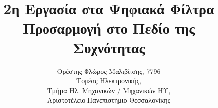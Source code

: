 

\renewcommand{\imageref}[1] {%
\hyperref[fig:#1]{Σχήμα \ref{fig:#1}}}
\renewcommand{\imagerefc}[2] {%
\hyperref[fig:#1]{#2}}

\newcommand{\imagehere}[2]{%
\begin{figure}[H]%
\centering%
\texttt{[image: images/\#1]}%
\caption{#2}
\label{fig:#1}%
\end{figure}%
}

\title{2η Εργασία στα Ψηφιακά Φίλτρα\\
Προσαρμογή στο Πεδίο της Συχνότητας}
\author{Ορέστης Φλώρος-Μαλιβίτσης, 7796\\
Τομέας Ηλεκτρονικής,\\
Τμήμα Ηλ. Μηχανικών / Μηχανικών ΗΥ,\\
Αριστοτέλειο Πανεπιστήμιο Θεσσαλονίκης}

\setcounter{section}{-1} %

\deactivateBG
\maketitle
\tableofcontents\newpage
\activateBG






